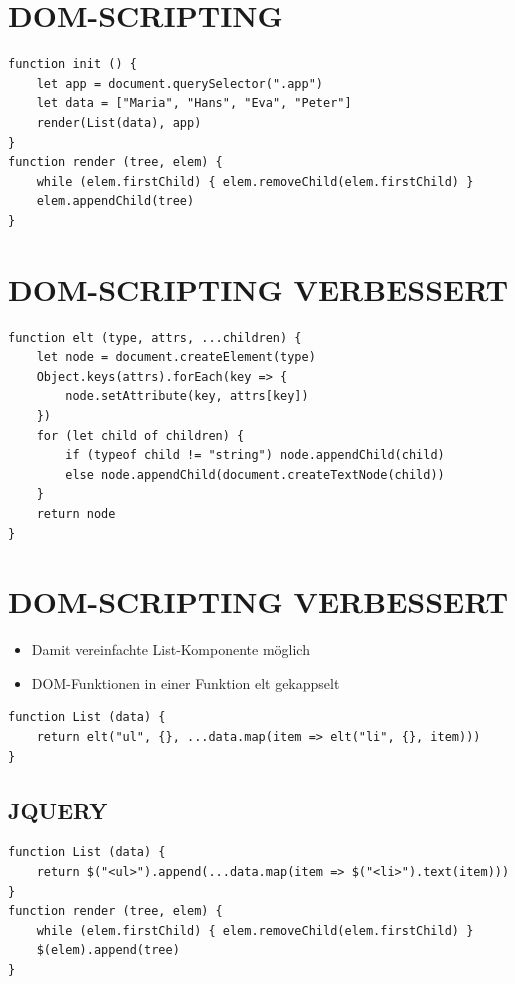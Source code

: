 \section*{DOM-SCRIPTING}
\begin{verbatim}
function init () {
    let app = document.querySelector(".app")
    let data = ["Maria", "Hans", "Eva", "Peter"]
    render(List(data), app)
}
function render (tree, elem) {
    while (elem.firstChild) { elem.removeChild(elem.firstChild) }
    elem.appendChild(tree)
}
\end{verbatim}

\section*{DOM-SCRIPTING VERBESSERT}
\begin{verbatim}
function elt (type, attrs, ...children) {
    let node = document.createElement(type)
    Object.keys(attrs).forEach(key => {
        node.setAttribute(key, attrs[key])
    })
    for (let child of children) {
        if (typeof child != "string") node.appendChild(child)
        else node.appendChild(document.createTextNode(child))
    }
    return node
}
\end{verbatim}

\section*{DOM-SCRIPTING VERBESSERT}
\begin{itemize}
  \item Damit vereinfachte List-Komponente möglich
  \item DOM-Funktionen in einer Funktion elt gekappselt
\end{itemize}

\begin{verbatim}
function List (data) {
    return elt("ul", {}, ...data.map(item => elt("li", {}, item)))
}
\end{verbatim}

\subsection{JQUERY}

\begin{verbatim}
function List (data) {
    return $("<ul>").append(...data.map(item => $("<li>").text(item)))
}
function render (tree, elem) {
    while (elem.firstChild) { elem.removeChild(elem.firstChild) }
    $(elem).append(tree)
}
\end{verbatim}

